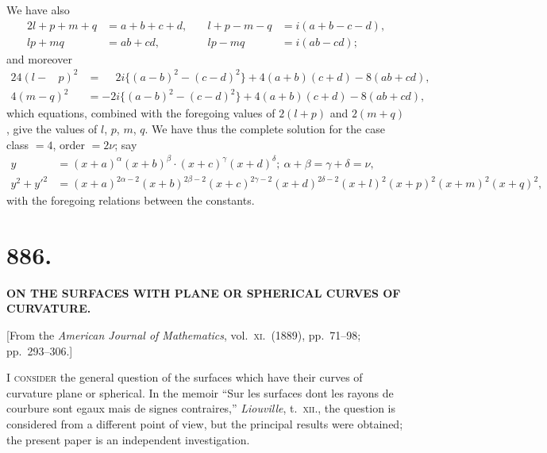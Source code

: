 \documentclass[11pt,a4paper]{book}
\begin{document}
We have also
\begin{alignat*}{2}
l+p+m+q &= a+b+c+d, &\quad l+p-m-q &= i(a+b-c-d), \\
lp+mq &= ab+cd, &\quad lp-mq &= i(ab-cd);
\end{alignat*}
and moreover
\begin{alignat*}{2}
4(l-\phantom{m}p)^2 &= \phantom{-}2i\{(a-b)^2-(c-d)^2\} + 4(a+b)(c+d) - 8(ab+cd), \\
4(m-q)^2 &= -2i\{(a-b)^2-(c-d)^2\} + 4(a+b)(c+d) - 8(ab+cd),
\end{alignat*}
which equations, combined with the foregoing values of $2(l+p)$ and $2(m+q)$, give the values of $l$, $p$, $m$, $q$. We have thus the complete solution for the case class $=4$, order $=2\nu$; say
\begin{align*}
y &= (x+a)^{\alpha} (x+b)^{\beta} \cdot (x+c)^{\gamma} (x+d)^{\delta};\ \alpha+\beta = \gamma+\delta = \nu, \\
y^2 + y'^2 &= (x+a)^{2\alpha-2} (x+b)^{2\beta-2} (x+c)^{2\gamma-2} (x+d)^{2\delta-2} (x+l)^2 (x+p)^2 (x+m)^2 (x+q)^2,
\end{align*}
with the foregoing relations between the constants.


\newpage
\section*{886.}

\begin{center}
\textbf{ON THE SURFACES WITH PLANE OR SPHERICAL CURVES OF CURVATURE.}
\end{center}

\begin{center}
[From the \textit{American Journal of Mathematics}, vol.\ \textsc{xi}.\ (1889), pp.\ 71--98; pp.\ 293--306.]
\end{center}

\textsc{I consider} the general question of the surfaces which have their curves of curvature plane or spherical. In the memoir ``Sur les surfaces dont les rayons de courbure sont egaux mais de signes contraires,'' \textit{Liouville}, t.~\textsc{xii}., the question is considered from a different point of view, but the principal results were obtained; the present paper is an independent investigation.
\end{document}
